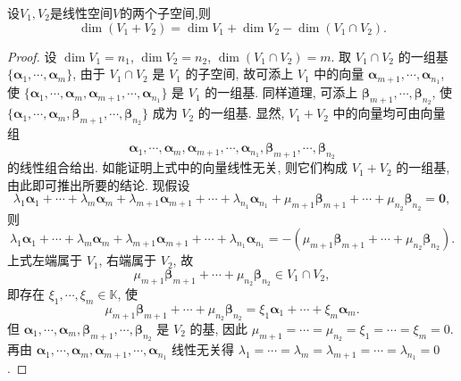 \documentclass[../../main.tex]{subfiles}
\begin{document}
\begin{theorem}[交和空间维数公式]\label{theorem:交和空间维数公式}
设\(V_1,V_2\)是线性空间\(V\)的两个子空间,则
\[
\dim(V_1 + V_2)=\dim V_1+\dim V_2-\dim(V_1\cap V_2).
\]
\end{theorem}
\begin{proof}
设 $\dim V_1 = n_1$, $\dim V_2 = n_2$, $\dim(V_1 \cap V_2) = m$. 取 $V_1 \cap V_2$ 的一组基 $\{\boldsymbol{\alpha}_1, \cdots, \boldsymbol{\alpha}_m\}$, 由于 $V_1 \cap V_2$ 是 $V_1$ 的子空间, 故可添上 $V_1$ 中的向量 $\boldsymbol{\alpha}_{m + 1}, \cdots, \boldsymbol{\alpha}_{n_1}$, 使 $\{\boldsymbol{\alpha}_1, \cdots, \boldsymbol{\alpha}_m, \boldsymbol{\alpha}_{m + 1}, \cdots, \boldsymbol{\alpha}_{n_1}\}$ 是 $V_1$ 的一组基. 同样道理, 可添上 $\boldsymbol{\beta}_{m + 1}, \cdots, \boldsymbol{\beta}_{n_2}$, 使 $\{\boldsymbol{\alpha}_1, \cdots, \boldsymbol{\alpha}_m, \boldsymbol{\beta}_{m + 1}, \cdots, \boldsymbol{\beta}_{n_2}\}$ 成为 $V_2$ 的一组基. 显然, $V_1 + V_2$ 中的向量均可由向量组
$$
\boldsymbol{\alpha}_1, \cdots, \boldsymbol{\alpha}_m, \boldsymbol{\alpha}_{m + 1}, \cdots, \boldsymbol{\alpha}_{n_1}, \boldsymbol{\beta}_{m + 1}, \cdots, \boldsymbol{\beta}_{n_2}
$$
的线性组合给出. 如能证明上式中的向量线性无关, 则它们构成 $V_1 + V_2$ 的一组基, 由此即可推出所要的结论. 现假设
$$
\lambda_1\boldsymbol{\alpha}_1 + \cdots + \lambda_m\boldsymbol{\alpha}_m + \lambda_{m + 1}\boldsymbol{\alpha}_{m + 1} + \cdots + \lambda_{n_1}\boldsymbol{\alpha}_{n_1} + \mu_{m + 1}\boldsymbol{\beta}_{m + 1} + \cdots + \mu_{n_2}\boldsymbol{\beta}_{n_2} = \boldsymbol{0},
$$
则
$$
\lambda_1\boldsymbol{\alpha}_1 + \cdots + \lambda_m\boldsymbol{\alpha}_m + \lambda_{m + 1}\boldsymbol{\alpha}_{m + 1} + \cdots + \lambda_{n_1}\boldsymbol{\alpha}_{n_1} = -(\mu_{m + 1}\boldsymbol{\beta}_{m + 1} + \cdots + \mu_{n_2}\boldsymbol{\beta}_{n_2}).
$$
上式左端属于 $V_1$, 右端属于 $V_2$, 故
$$
\mu_{m + 1}\boldsymbol{\beta}_{m + 1} + \cdots + \mu_{n_2}\boldsymbol{\beta}_{n_2} \in V_1 \cap V_2,
$$
即存在 $\xi_1, \cdots, \xi_m \in \mathbb{K}$, 使
$$
\mu_{m + 1}\boldsymbol{\beta}_{m + 1} + \cdots + \mu_{n_2}\boldsymbol{\beta}_{n_2} = \xi_1\boldsymbol{\alpha}_1 + \cdots + \xi_m\boldsymbol{\alpha}_m.
$$
但 $\boldsymbol{\alpha}_1, \cdots, \boldsymbol{\alpha}_m, \boldsymbol{\beta}_{m + 1}, \cdots, \boldsymbol{\beta}_{n_2}$ 是 $V_2$ 的基, 因此 $\mu_{m + 1} = \cdots = \mu_{n_2} = \xi_1 = \cdots = \xi_m = 0$. 再由 $\boldsymbol{\alpha}_1, \cdots, \boldsymbol{\alpha}_m, \boldsymbol{\alpha}_{m + 1}, \cdots, \boldsymbol{\alpha}_{n_1}$ 线性无关得 $\lambda_1 = \cdots = \lambda_m = \lambda_{m + 1} = \cdots = \lambda_{n_1} = 0$. 
\end{proof}
\end{document}
